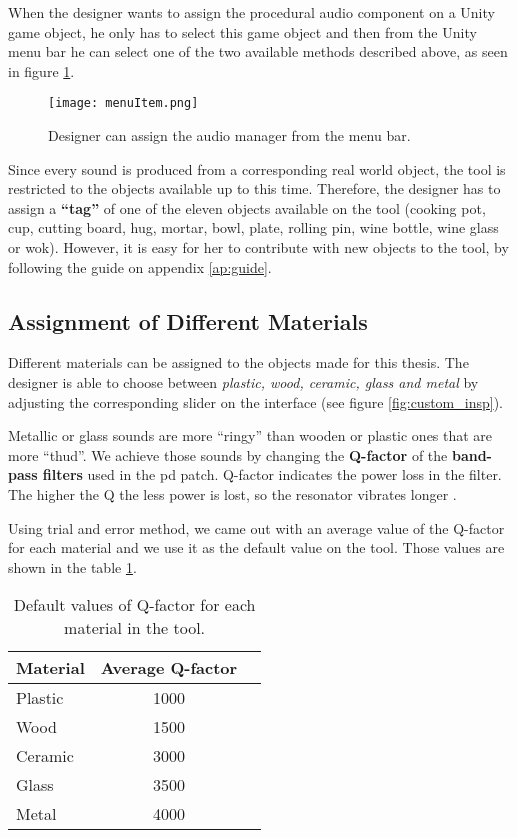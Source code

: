 When the designer wants to assign the procedural audio component on a Unity game object, he only has to select this game object and then from the Unity menu bar he can select one of the two available methods described above, as seen in figure \ref{fig:menu_item}.
\begin{figure}[H]
  \centering
    \texttt{[image: menuItem.png]}
      \caption{Designer can assign the audio manager from the menu bar.}
      \label{fig:menu_item}
\end{figure}

Since every sound is produced from a corresponding real world object, the tool is restricted to the objects available up to this time. Therefore, the designer has to assign a \textbf{``tag''} of one of the eleven objects available on the tool (cooking pot, cup, cutting board, hug, mortar, bowl, plate, rolling pin, wine bottle, wine glass or wok). However, it is easy for her to contribute with new objects to the tool, by following the guide on appendix \ref{ap:guide}.

\subsection{Assignment of Different Materials}
Different materials can be assigned to the objects made for this thesis. The designer is able to choose between \textit{plastic, wood, ceramic, glass and metal} by adjusting the corresponding slider on the interface (see figure \ref{fig:custom_insp}). 

Metallic or glass sounds are more ``ringy'' than wooden or plastic ones that are more ``thud''. We achieve those sounds by changing the \textbf{Q-factor} of the \textbf{band-pass filters} used in the pd patch. Q-factor indicates the power loss in the filter. The higher the Q the less power is lost, so the resonator vibrates longer \cite{bib:Q}.

Using trial and error method, we came out with an average value of the Q-factor for each material and we use it as the default value on the tool. Those values are shown in the table \ref{tab:default_Q}.

\begin{table}[H]
	\centering
    \begin{tabular}{ | l | c | p{5cm} |}
    \hline
    \textbf{Material} & \textbf{Average Q-factor} \\ \hline
    Plastic & 1000 \\ \hline
    Wood & 1500 \\ \hline
    Ceramic & 3000 \\ \hline
    Glass & 3500 \\ \hline
    Metal & 4000 \\
    \hline
    \end{tabular}
    \caption{Default values of Q-factor for each material in the tool.}
    \label{tab:default_Q}
\end{table} 

